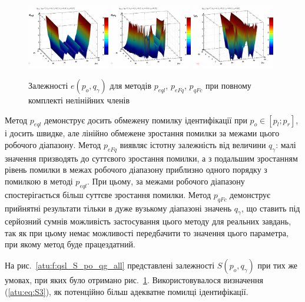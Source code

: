 \documentclass[a4paper,13pt]{atuaref}
\begin{document}
\begin{figure}[htb!]
  \centerline{
    \includegraphics[width=0.32\textwidth]{p3/p/qls_pe-p_po_qg_eql_all.png}
    \hfill
    \includegraphics[width=0.32\textwidth]{p3/p/qls_pe-p_po_qg_eFq_all.png}
    \hfill
    \includegraphics[width=0.32\textwidth]{p3/p/qls_pe-p_po_qg_eFc_all.png}
  }
  \caption{Залежності $e(p_o,q_\gamma)$ для методів $p_{eql}$, $p_{eFq}$, $p_{qFc}$ при повному комплекті нелінійних членів}
  \label{atu:f:qsl_pe_po_qg_all}
\end{figure}

Метод $ p_ {eql} $ демонструє досить обмежену помилку ідентифікації при
$ p_o \in [p_l; p_r] $, і досить швидке, але лінійно обмежене зростання помилки за
межами цього робочого діапазону. Метод $ p_{eFq} $ виявляє істотну залежність
від величини $ q_\gamma $: малі значення призводять до суттєвого
зростання помилки, а з подальшим зростанням рівень помилки в межах робочого
діапазону приблизно одного порядку з помилкою в методі $ p_{eql} $. При
цьому, за межами робочого діапазону спостерігається більш суттєве зростання
помилки. Метод $ p_ {qFc} $ демонструє прийнятні результати тільки в дуже
вузькому діапазоні значень $ q_\gamma $, що ставить під серйозний сумнів
можливість застосування цього методу для реальних завдань, так як при цьому
немає можливості передбачити то значення цього параметра, при якому метод буде
працездатний.

На рис.~\ref{atu:f:qsl_S_po_qg_all} представлені залежності
$ S (p_o, q_\gamma) $
при тих же умовах, при яких було отримано рис.~\ref{atu:f:qsl_pe_po_qg_all}.
Використовувалося визначення (\ref{atu:eq:S3}), як
потенційно більш адекватне помилці ідентифікації.
\end{document}
